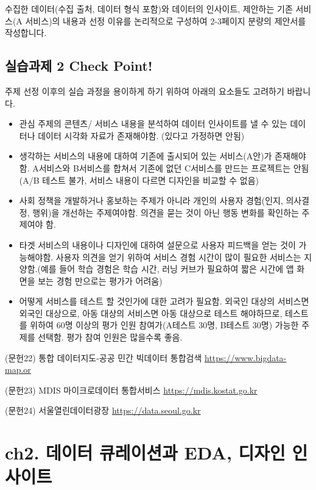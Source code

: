 \documentclass[
  letterpaper,
]{book}
\providecommand{\tightlist}{%
  \setlength{\itemsep}{0pt}\setlength{\parskip}{0pt}}\usepackage{longtable,booktabs,array}
\begin{document}
수집한 데이터(수집 출처, 데이터 형식 포함)와 데이터의 인사이트, 제안하는
기존 서비스(A 서비스)의 내용과 선정 이유를 논리적으로 구성하여 2-3페이지
분량의 제안서를 작성합니다.

\section{실습과제 2 Check
Point!}\label{uxc2e4uxc2b5uxacfcuxc81c-2-check-point}

주제 선정 이후의 실습 과정을 용이하게 하기 위하여 아래의 요소들도
고려하기 바랍니다.

\begin{itemize}
\tightlist
\item
  관심 주제의 콘텐츠/ 서비스 내용을 분석하여 데이터 인사이트를 낼 수
  있는 데이터나 데이터 시각화 자료가 존재해야함. (있다고 가정하면 안됨)
\item
  생각하는 서비스의 내용에 대하여 기존에 출시되어 있는 서비스(A안)가
  존재해야함. A서비스와 B서비스를 합쳐서 기존에 없던 C서비스를 만드는
  프로젝트는 안됨 (A/B 테스트 불가, 서비스 내용이 다르면 디자인을 비교할
  수 없음)
\item
  사회 정책을 개발하거나 홍보하는 주제가 아니라 개인의 사용자 경험(인지,
  의사결정, 행위)을 개선하는 주제여야함. 의견을 묻는 것이 아닌 행동
  변화를 확인하는 주제여야 함.
\item
  타겟 서비스의 내용이나 디자인에 대하여 설문으로 사용자 피드백을 얻는
  것이 가능해야함. 사용자 의견을 얻기 위하여 서비스 경험 시간이 많이
  필요한 서비스는 지양함.(예를 들어 학습 경험은 학습 시간, 러닝 커브가
  필요하여 짧은 시간에 앱 화면을 보는 경험 만으로는 평가가 어려움)
\item
  어떻게 서비스를 테스트 할 것인가에 대한 고려가 필요함. 외국인 대상의
  서비스면 외국인 대상으로, 아동 대상의 서비스면 아동 대상으로 테스트
  해야하므로, 테스트를 위하여 60명 이상의 평가 인원 참여가(A테스트 30명,
  B테스트 30명) 가능한 주제를 선택함. 평가 참여 인원은 많을수록 좋음.
\end{itemize}

(문헌22) 통합 데이터지도-공공 민간 빅데이터 통합검색
\url{https://www.bigdata-map.or}

(문헌23) MDIS 마이크로데이터 통합서비스 \url{https://mdis.kostat.go.kr}

(문헌24) 서울열린데이터광장 \url{https://data.seoul.go.kr}

\chapter{ch2. 데이터 큐레이션과 EDA, 디자인
인사이트}\label{ch2.-uxb370uxc774uxd130-uxd050uxb808uxc774uxc158uxacfc-eda-uxb514uxc790uxc778-uxc778uxc0acuxc774uxd2b8}
\end{document}
